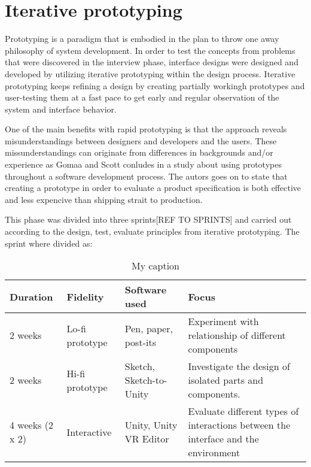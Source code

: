 \section{Iterative prototyping}
Prototyping is a paradigm that is embodied in the plan to throw one
away philosophy of system development. \cite{proto:Gomaa1981}
In order to test the concepts from problems that were discovered in the interview phase, interface designs were designed and developed by utilizing iterative prototyping within the design process. Iterative prototyping keeps refining a design by creating partially workingh prototypes and user-testing them at a fast pace to get early and regular observation of the system and interface behavior.

One of the main benefits with rapid prototyping is that the approach reveals misunderstandings between
designers and developers and the  users. These missunderstandings can originate from differences in backgrounds and/or experience as Gomaa and Scott conludes in a study about using prototypes throughout a software development process. The autors goes on to state that creating a prototype in order to evaluate a product specification is both effective and less expencive than shipping strait to production.
\cite{proto:Lichter1993}

This phase was divided into three sprints[REF TO SPRINTS] and carried out according to the design, test, evaluate principles from iterative prototyping. The sprint where divided as:

\begin{table}[]
  \centering
  \caption{My caption}
  \label{table:sprints}
  \begin{tabular}{|l|l|l| p{5cm}|}
     \hline
    \textbf{Duration} & \textbf{Fidelity} & \textbf{Software used} & \textbf{Focus} \\\hline
    2 weeks                         & Lo-fi prototype  & Pen, paper, post-its    & Experiment with relationship of different components                               \\\hline
    2 weeks                        & Hi-fi prototype & Sketch, Sketch-to-Unity & Investigate the design of isolated parts and components.                           \\\hline
    4 weeks (2 x 2)                 & Interactive   & Unity, Unity VR Editor  & Evaluate different types of interactions between the interface and the environment  \\\hline
  \end{tabular}
\end{table}
